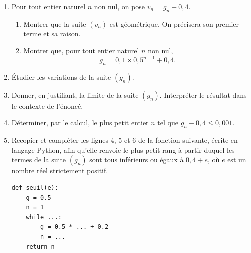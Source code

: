 \documentclass[11pt,a4paper]{article}
\begin{document}
\begin{enumerate}
\begin{enumerate}
\begin{center}
    \end{center}
    \item Justifier que pour tout entier naturel $n$ non nul,
    \[
    g_{n+1}=0{,}5g_n+0{,}2.
    \]
  \end{enumerate}
\item Pour tout entier naturel $n$ non nul, on pose $v_n=g_n-0{,}4$.
  \begin{enumerate}
    \item Montrer que la suite $(v_n)$ est géométrique. On précisera son premier terme et sa raison.
    \item Montrer que, pour tout entier naturel $n$ non nul,
    \[
    g_n=0{,}1\times 0{,}5^{n-1}+0{,}4.
    \]
  \end{enumerate}
  \item Étudier les variations de la suite $(g_n)$.
\item Donner, en justifiant, la limite de la suite $(g_n)$. Interpréter le résultat dans le contexte de l'énoncé.
\item Déterminer, par le calcul, le plus petit entier $n$ tel que $g_n-0{,}4\leqslant 0{,}001$.
\item Recopier et compléter les lignes 4, 5 et 6 de la fonction suivante, écrite en langage Python, afin qu'elle renvoie le plus petit rang à partir duquel les termes de la suite $(g_n)$ sont tous inférieurs ou égaux à $0{,}4+e$, où $e$ est un nombre réel strictement positif.
\begin{lstlisting}
def seuil(e):
    g = 0.5
    n = 1
    while ...:
        g = 0.5 * ... + 0.2
        n = ...
    return n
\end{lstlisting}
\end{enumerate}
\end{document}
